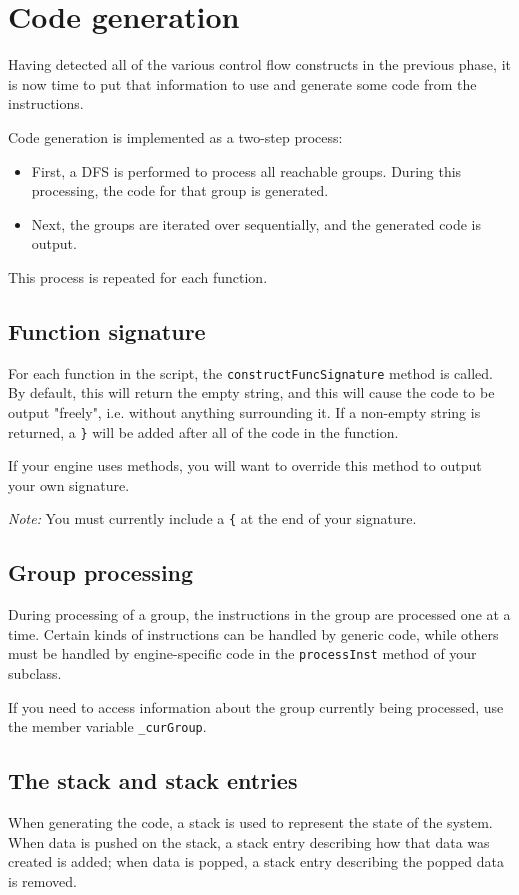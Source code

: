 \section{Code generation}
\label{sec:codegen}

Having detected all of the various control flow constructs in the previous phase, it is now time to put that information to use and generate some code from the instructions.

Code generation is implemented as a two-step process:
\begin{itemize}
\item First, a DFS is performed to process all reachable groups. During this processing, the code for that group is generated.
\item Next, the groups are iterated over sequentially, and the generated code is output.
\end{itemize}

This process is repeated for each function.

\subsection{Function signature}
For each function in the script, the \verb+constructFuncSignature+ method is called. By default, this will return the empty string, and this will cause the code to be output "freely", i.e. without anything surrounding it. If a non-empty string is returned, a \verb+}+ will be added after all of the code in the function.

If your engine uses methods, you will want to override this method to output your own signature.

\emph{Note:} You must currently include a \verb+{+ at the end of your signature.

\subsection{Group processing}
During processing of a group, the instructions in the group are processed one at a time. Certain kinds of instructions can be handled by generic code, while others must be handled by engine-specific code in the \verb+processInst+ method of your subclass.

If you need to access information about the group currently being processed, use the member variable \verb+_curGroup+.

\subsection{The stack and stack entries}
When generating the code, a stack is used to represent the state of the system. When data is pushed on the stack, a stack entry describing how that data was created is added; when data is popped, a stack entry describing the popped data is removed.

